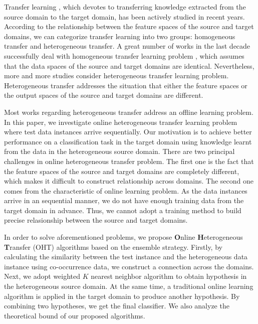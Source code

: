 \documentclass{article} %
\theoremstyle{remark}
\theoremstyle{definition}
\begin{document}
Transfer learning \cite{pan2010survey}, which devotes to transferring knowledge extracted from the source domain to the target domain, has been actively studied in recent years.
According to the relationship between the feature spaces of the source and target domains, we can categorize transfer learning into two groups: homogeneous transfer and heterogeneous transfer.
A great number of works in the last decade successfully deal with homogeneous transfer learning problem \cite{liao2005logistic,dai2007boosting,dai2007transferring,eaton2011selective}, which assumes that the data spaces of the source and target domains are identical.
Nevertheless, more and more studies consider heterogeneous transfer learning problem.
Heterogeneous transfer addresses the situation that either the feature spaces or the output spaces of the source and target domains are different.

Most works regarding heterogeneous transfer address an offline learning problem.
In this paper, we investigate online heterogeneous transfer learning problem where test data instances arrive sequentially.
Our motivation is to achieve better performance on a classification task in the target domain using knowledge learnt from the data in the heterogeneous source domain.
There are two principal challenges in online heterogeneous transfer problem.
The first one is the fact that the feature spaces of the source and target domains are completely different, which makes it difficult to construct relationship across domains.
The second one comes from the characteristic of online learning problem.
As the data instances arrive in an sequential manner, we do not have enough training data from the target domain in advance.
Thus, we cannot adopt a training method to build precise relasionship between the source and target domains.

In order to solve aforementioned problems, we propose \textbf{O}nline \textbf{H}eterogeneous \textbf{T}ransfer (OHT) algorithms based on the ensemble strategy.
Firstly, by calculating the similarity between the test instance and the heterogeneous data instance using co-occurrence data, we construct a connection across the domains.
Next, we adopt weighted $K$ nearest neighbor algorithm to obtain hypothesis in the heterogeneous source domain.
At the same time, a traditional online learning algorithm is applied in the target domain to produce another hypothesis.
By combining two hypotheses, we get the final classifier.
We also analyze the theoretical bound of our proposed algorithms.
\end{document}
